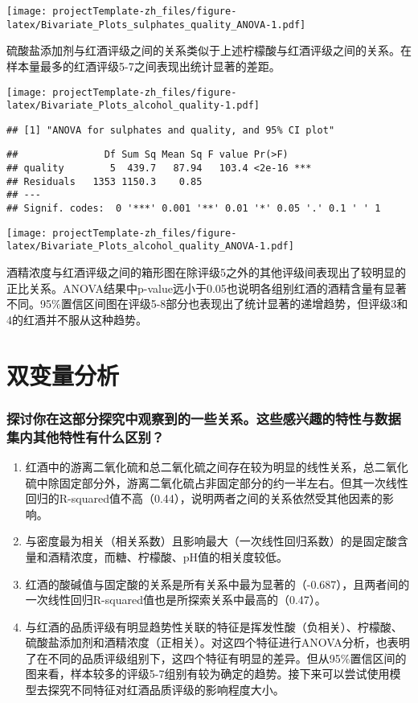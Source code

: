 \documentclass[]{article}
\begin{document}
\texttt{[image: projectTemplate-zh\_files/figure-latex/Bivariate\_Plots\_sulphates\_quality\_ANOVA-1.pdf]}

硫酸盐添加剂与红酒评级之间的关系类似于上述柠檬酸与红酒评级之间的关系。在样本量最多的红酒评级5-7之间表现出统计显著的差距。

\texttt{[image: projectTemplate-zh\_files/figure-latex/Bivariate\_Plots\_alcohol\_quality-1.pdf]}

\begin{verbatim}
## [1] "ANOVA for sulphates and quality, and 95% CI plot"
\end{verbatim}

\begin{verbatim}
##               Df Sum Sq Mean Sq F value Pr(>F)    
## quality        5  439.7   87.94   103.4 <2e-16 ***
## Residuals   1353 1150.3    0.85                   
## ---
## Signif. codes:  0 '***' 0.001 '**' 0.01 '*' 0.05 '.' 0.1 ' ' 1
\end{verbatim}

\texttt{[image: projectTemplate-zh\_files/figure-latex/Bivariate\_Plots\_alcohol\_quality\_ANOVA-1.pdf]}

酒精浓度与红酒评级之间的箱形图在除评级5之外的其他评级间表现出了较明显的正比关系。ANOVA结果中p-value远小于0.05也说明各组别红酒的酒精含量有显著不同。95\%置信区间图在评级5-8部分也表现出了统计显著的递增趋势，但评级3和4的红酒并不服从这种趋势。

\section{双变量分析}

\subsubsection{探讨你在这部分探究中观察到的一些关系。这些感兴趣的特性与数据集内其他特性有什么区别？}

\begin{enumerate}
\def\labelenumi{\arabic{enumi}.}
\item
  红酒中的游离二氧化硫和总二氧化硫之间存在较为明显的线性关系，总二氧化硫中除固定部分外，游离二氧化硫占非固定部分的约一半左右。但其一次线性回归的R-squared值不高（0.44），说明两者之间的关系依然受其他因素的影响。
\item
  与密度最为相关（相关系数）且影响最大（一次线性回归系数）的是固定酸含量和酒精浓度，而糖、柠檬酸、pH值的相关度较低。
\item
  红酒的酸碱值与固定酸的关系是所有关系中最为显著的（-0.687），且两者间的一次线性回归R-squared值也是所探索关系中最高的（0.47）。
\item
  与红酒的品质评级有明显趋势性关联的特征是挥发性酸（负相关）、柠檬酸、硫酸盐添加剂和酒精浓度（正相关）。对这四个特征进行ANOVA分析，也表明了在不同的品质评级组别下，这四个特征有明显的差异。但从95\%置信区间的图来看，样本较多的评级5-7组别有较为确定的趋势。接下来可以尝试使用模型去探究不同特征对红酒品质评级的影响程度大小。
\end{enumerate}
\end{document}
